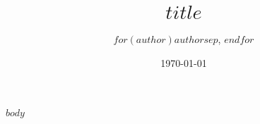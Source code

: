 \documentclass{zettel}
\title{$title$}
\author{$for(author)$$author$$sep$, $endfor$}
\date{\today}
\begin{document}
\maketitle
\tableofcontents

\newpage

$body$
\end{document}
